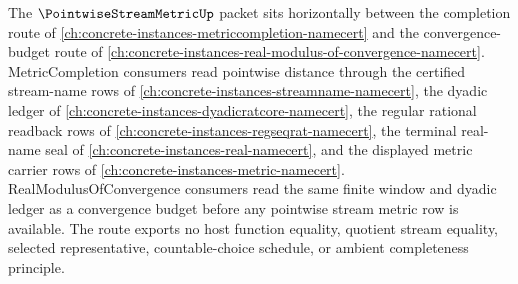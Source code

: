 The $\PointwiseStreamMetricUp$ packet sits horizontally between the completion route of \autoref{ch:concrete-instances-metriccompletion-namecert} and the convergence-budget route of \autoref{ch:concrete-instances-real-modulus-of-convergence-namecert}. MetricCompletion consumers read pointwise distance through the certified stream-name rows of \autoref{ch:concrete-instances-streamname-namecert}, the dyadic ledger of \autoref{ch:concrete-instances-dyadicratcore-namecert}, the regular rational readback rows of \autoref{ch:concrete-instances-regseqrat-namecert}, the terminal real-name seal of \autoref{ch:concrete-instances-real-namecert}, and the displayed metric carrier rows of \autoref{ch:concrete-instances-metric-namecert}. RealModulusOfConvergence consumers read the same finite window and dyadic ledger as a convergence budget before any pointwise stream metric row is available. The route exports no host function equality, quotient stream equality, selected representative, countable-choice schedule, or ambient completeness principle.

